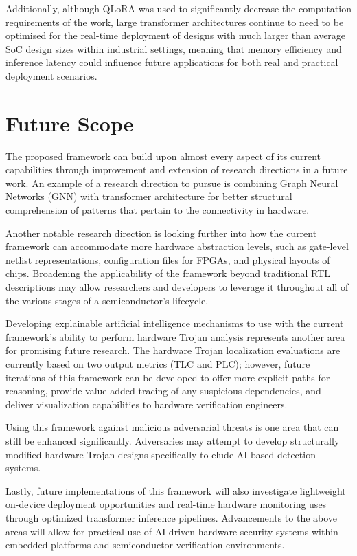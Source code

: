 \documentclass[12pt,a4paper]{report}
\begin{document}
Additionally, although QLoRA was used to significantly decrease the computation requirements of the work, large transformer architectures continue to need to be optimised for the real-time deployment of designs with much larger than average SoC design sizes within industrial settings, meaning that memory efficiency and inference latency could influence future applications for both real and practical deployment scenarios.

\section{Future Scope}

The proposed framework can build upon almost every aspect of its current capabilities through improvement and extension of research directions in a future work. An example of a research direction to pursue is combining Graph Neural Networks (GNN) with transformer architecture for better structural comprehension of patterns that pertain to the connectivity in hardware.

Another notable research direction is looking further into how the current framework can accommodate more hardware abstraction levels, such as gate-level netlist representations, configuration files for FPGAs, and physical layouts of chips. Broadening the applicability of the framework beyond traditional RTL descriptions may allow researchers and developers to leverage it throughout all of the various stages of a semiconductor's lifecycle.

Developing explainable artificial intelligence mechanisms to use with the current framework's ability to perform hardware Trojan analysis represents another area for promising future research. The hardware Trojan localization evaluations are currently based on two output metrics (TLC and PLC); however, future iterations of this framework can be developed to offer more explicit paths for reasoning, provide value-added tracing of any suspicious dependencies, and deliver visualization capabilities to hardware verification engineers.

Using this framework against malicious adversarial threats is one area that can still be enhanced significantly. Adversaries may attempt to develop structurally modified hardware Trojan designs specifically to elude AI-based detection systems.

Lastly, future implementations of this framework will also investigate lightweight on-device deployment opportunities and real-time hardware monitoring uses through optimized transformer inference pipelines. Advancements to the above areas will allow for practical use of AI-driven hardware security systems within embedded platforms and semiconductor verification environments.
\end{document}
